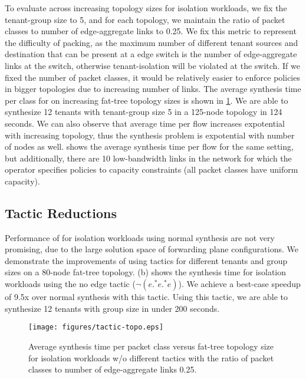 To evaluate \Name across increasing topology sizes for isolation workloads, 
we fix the tenant-group size to 5, and for each topology, we maintain
 the ratio of packet classes to number of edge-aggregate links to 0.25. 
 We fix this metric to represent the difficulty of packing, as the maximum number 
 of different tenant sources and destination that can be present at a edge switch
 is the number of edge-aggregate links at the switch, otherwise tenant-isolation
 will be violated at the switch. If we fixed the number of packet classes, it would 
 be relatively easier to enforce policies in bigger topologies due to increasing 
 number of links. The average synthesis time per class for
 on increasing fat-tree topology sizes is shown in \cref{fig:tactic-topo}. 
 We are able to synthesize 12 tenants with tenant-group size 5 in a 125-node topology in 124 seconds. 
  We can also observe that average time per flow increases expotential 
  with increasing topology, thus the synthesis problem is expotential with number of nodes as well. 
  shows the average synthesis time per flow for the same setting, but
 additionally, there are 10 low-bandwidth links in the network for which the operator
 specifies policies to capacity constraints (all packet classes have uniform capacity). 

 \subsection{Tactic Reductions}
 Performance of \Name for isolation workloads using normal synthesis are not 
 very promising, due to the large solution space of forwarding plane configurations. We 
 demonstrate the improvements of using tactics for different tenants and group sizes on a 
 80-node fat-tree topology.
 (b) shows the synthesis time for isolation workloads using the no edge tactic 
 ($\neg(e .^* e .^* e)$). We achieve a best-case speedup of 9.5x over normal synthesis with this tactic. 
 Using this tactic, we are able to synthesize 12 tenants with group size in under 200
 seconds.
 
 \begin{figure}[h]
 	\texttt{[image: figures/tactic-topo.eps]}
 	\caption{Average synthesis time per packet class versus fat-tree topology size for isolation workloads 
 		w/o different tactics with the ratio of packet classes to number of edge-aggregate links 0.25.}
 	\label{fig:tactic-topo}
 \end{figure}
 
